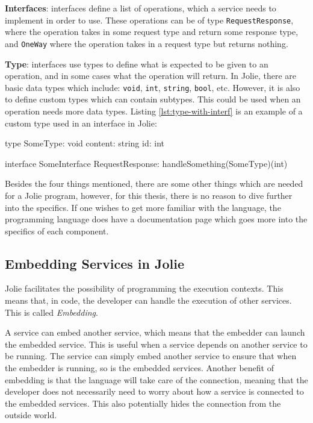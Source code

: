 \textbf{Interfaces}: interfaces define a list of operations, which a service needs to implement in order to use. These operations can be of type \texttt{RequestResponse}, where the operation takes in some request type and return some response type, 
and \texttt{OneWay} where the operation takes in a request type but returns nothing.

\textbf{Type}: interfaces use types to define what is expected to be given to an operation, and in some cases what the operation will return. In Jolie, there are basic
data types which include: \texttt{void}, \texttt{int}, \texttt{string}, \texttt{bool}, etc. However, it is also to define custom types which can contain subtypes. 
This could be used when an operation needs more data types.
Listing \ref*{lst:type-with-interf} is an example of a custom type used in an interface in Jolie:
\begin{jolisting}[][caption={Custom type used in an interface in Jolie},label=lst:type-with-interf]
type SomeType: void {
    content: string
    id: int
}

interface SomeInterface {
    RequestResponse:
        handleSomething(SomeType)(int)
}
\end{jolisting}

Besides the four things mentioned, there are some other things which are needed for a Jolie program, however, for this thesis, there is no reason to dive further into the specifics. 
If one wishes to get more familiar with the language, the programming language does have a documentation page which goes more into the specifics of each component.

\subsection{Embedding Services in Jolie}
Jolie facilitates the possibility of programming the execution contexts.
This means that, in code, the developer can handle the execution of other services. This is called \textit{Embedding}.

A service can embed another service, which means that the embedder can launch the embedded service. This is useful when a service depends on another service to be running.
The service can simply embed another service to ensure that when the embedder is running, so is the embedded services.
Another benefit of embedding is that the language will take care of the connection, meaning that the developer does not necessarily need to worry about how a service is connected to the embedded services.
This also potentially hides the connection from the outside world.

